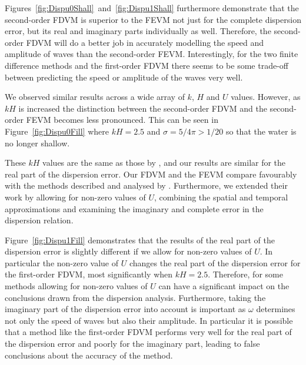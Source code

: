 Figures~\ref{fig:Dispu0Shall}~and~\ref{fig:Dispu1Shall} furthermore demonstrate that the second-order FDVM is superior to the FEVM not just for the complete dispersion error, but its real and imaginary parts individually as well. Therefore, the second-order FDVM will do a better job in accurately modelling the speed and amplitude of waves than the second-order FEVM. Interestingly, for the two finite difference methods and the first-order FDVM there seems to be some trade-off between predicting the speed or amplitude of the waves very well. 

We observed similar results across a wide array of $k$, $H$ and $U$ values. However, as $kH$ is increased the distinction between the second-order FDVM and the second-order FEVM becomes less pronounced. This can be seen in Figure~\ref{fig:Dispu0Fill} where $kH = 2.5$ and $\sigma = 5/4 \pi > 1/20$ so that the water is no longer shallow.

These $kH$ values are the same as those by \citet{Filippini-etal-2016-381}, and our results are similar for the real part of the dispersion error. Our FDVM and the FEVM compare favourably with the methods described and analysed by \citet{Filippini-etal-2016-381}. Furthermore, we extended their work by allowing for non-zero values of $U$, combining the spatial and temporal approximations and examining the imaginary and complete error in the dispersion relation. 

Figure~\ref{fig:Dispu1Fill} demonstrates that the results of the real part of the dispersion error  is slightly different if we allow for non-zero values of $U$. In particular the non-zero value of $U$ changes the real part of the dispersion error for the first-order FDVM, most significantly when $kH = 2.5$. Therefore, for some methods allowing for non-zero values of $U$ can have a significant impact on the conclusions drawn from the dispersion analysis. Furthermore, taking the imaginary part of the dispersion error into account is important as $\omega$ determines not only the speed of waves but also their amplitude. In particular it is possible that a method like the first-order FDVM performs very well for the real part of the dispersion error and poorly for the imaginary part, leading to false conclusions about the accuracy of the method.


